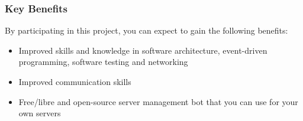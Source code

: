 \documentclass[../proposal-for-projects-2025.tex]{subfiles}
\begin{document}
\subsubsection*{Key Benefits}

By participating in this project, you can expect to gain the following benefits:

\begin{itemize}
    \item Improved skills and knowledge in software architecture, event-driven programming, software testing and networking
    \item Improved communication skills
    \item Free/libre and open-source server management bot that you can use for your own servers
\end{itemize}
\end{document}
